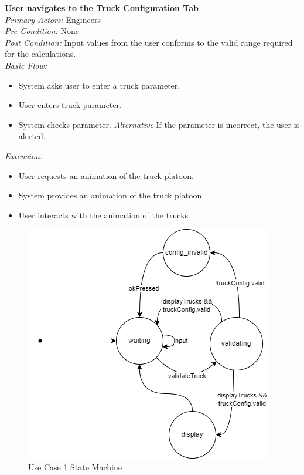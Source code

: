 \documentclass[12pt]{article}
\begin{document}
\noindent
\textbf{User navigates to the Truck Configuration Tab} \\
\emph{  Primary Actors:} Engineers\\
\emph{  Pre Condition:} None\\
\emph{  Post Condition:} Input values from the user conforms to the valid range required for the calculations.\\ 
\emph{  Basic Flow:} 
\begin{itemize}
\item System asks user to enter a truck parameter.
\item User enters truck parameter.
\item System checks parameter.
\subitem \emph{Alternative} If the parameter is incorrect, the user is alerted.
\end{itemize}
\emph{  Extension:}
\begin{itemize}
\item User requests an animation of the truck platoon.
\item System provides an animation of the truck platoon.
\item User interacts with the animation of the trucks. 
\end{itemize}
\begin{figure}[H]
  \centering
  \includegraphics[width=0.5\linewidth]{use-case-1-sm.png}
  \caption{Use Case 1 State Machine}
  \label {fig:use-case-1-sm}
\end{figure}
\end{document}
